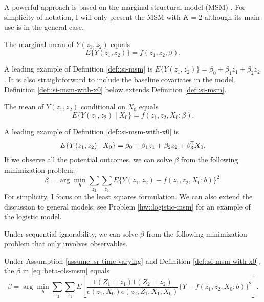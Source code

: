A powerful approach is based on the marginal structural model (MSM) \citep{robins2000marginal, hernan2000marginal}. 
For simplicity of notation, I will only present the MSM with $K=2$ although its main use is in the general case. 

\begin{definition}
[MSM]
\label{def::si-msm}
The marginal mean of $Y(z_1, z_2)$ equals
$$
E\{  Y(z_1, z_2) \} = f(z_1,z_2; \beta). 
$$
\end{definition}


A leading example of Definition \ref{def::si-msm} is $E\{  Y(z_1, z_2) \} = \beta_0 + \beta_1 z_1 + \beta_2 z_2$. It is also straightforward to include the baseline covariates in the model. Definition \ref{def::si-msm-with-x0} below extends Definition \ref{def::si-msm}. 

 \begin{definition}
\label{def::si-msm-with-x0}
The mean of $Y(z_1, z_2)$ conditional on $X_0$ equals
$$
E\{  Y(z_1, z_2) \mid X_0 \} = f(z_1,z_2, X_0; \beta). 
$$
\end{definition}

A leading example of Definition \ref{def::si-msm-with-x0} is 
\begin{equation}\label{eq::linear-msm}
E\{  Y(z_1, z_2)  \mid X_0\} = \beta_0 + \beta_1 z_1 + \beta_2 z_2 + \beta_3\tran X_0 .
\end{equation}
If we observe all the potential outcomes, we can solve $\beta$ from the following minimization problem:
\begin{equation}
\label{eq::beta-ols-msm}
\beta = \arg\min_b \sum_{z_2}\sum_{z_1}  E \{  Y(z_1, z_2) -  f(z_1,z_2, X_0; b)   \}^2 .
\end{equation}
For simplicity, I focus on the least squares formulation. We can also extend the discussion to general models; see Problem \ref{hw::logistic-msm} for an example of the logistic model. 



Under sequential ignorability, we can solve $\beta$ from the following minimization problem that only involves observables.


\begin{theorem}
\label{thm::si-msm-ipw}
Under Assumption \ref{assume::sr-time-varying} and Definition \ref{def::si-msm-with-x0}, the $\beta$ in \eqref{eq::beta-ols-msm} equals 
$$
\beta = \arg\min_b \sum_{z_2}\sum_{z_1}  E\left[   \frac{  1(Z_1=z_1) 1(Z_2=z_2)   }{   e(z_1, X_0) e(z_2, Z_1, X_1, X_0)     }      
\{ Y -  f(z_1,z_2, X_0; b)  \}^2 \right] .
$$
\end{theorem}

